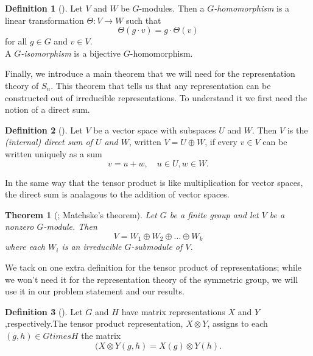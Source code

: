 \documentclass[12pt,twoside]{reedthesis}
\theoremstyle{plain}   %
\newtheorem{thm}{Theorem}[section] %
\theoremstyle{definition}
\newtheorem{defn}{Definition}[section]
\theoremstyle{remark}
\numberwithin{equation}{section}
\begin{document}
  \begin{defn}[{\cite[Definition 1.6.1]{sagan}}]
    Let $V$ and $W$ be $G$-modules. Then a \emph{$G$-homomorphism} is a linear transformation $\Theta: V \to W$ such that
    \[\Theta(g \cdot v) = g \cdot \Theta(v)\]
    for all $g \in G$ and $v \in V$.\\
    A \emph{$G$-isomorphism} is a bijective $G$-homomorphism.
  \end{defn}

  Finally, we introduce a main theorem that we will need for the representation theory of $S_n$.
  This theorem that tells us that any representation can be constructed out of irreducible representations.
  To understand it we first need the notion of a direct sum.
  \begin{defn}[{\cite[Definition 1.5.1]{sagan}}]
    Let $V$ be a vector space with subspaces $U$ and $W$.
    Then $V$ is the \emph{(internal) direct sum of $U$ and $W$}, written $V = U \oplus W$, if every $v \in V$ can be
    written uniquely as a sum
    \[v= u +w, \quad u \in U, w \in W.\]
  \end{defn}
  In the same way that the tensor product is like multiplication for vector spaces, the direct sum is analagous to the addition of vector spaces.
  \begin{thm}[{\cite[Theorem 1.5.3]{sagan}; Matchske's theorem}]
    Let $G$ be a finite group and let $V$ be a nonzero $G$-module. Then
    \[ V = W_1 \oplus W_2 \oplus \dots \oplus W_k\]
    where each $W_i$ is an irreducible $G$-submodule of $V$.
  \end{thm}

  We tack on one extra definition for the tensor product of representations; while we won't need it for the representation theory of the symmetric group,
  we will use it in our problem statement and our results.
  \begin{defn}[{\cite[Definition 1.11.1]{sagan}}]
    Let $G$ and $H$ have matrix representations $X$ and $Y$,respectively.The tensor product representation, $X  \otimes Y$, assigns to each $(g, h) \in G times H$ the matrix
    \[( X \otimes Y (g,h) = X(g)  \otimes Y(h). \]
  \end{defn}
\end{document}
